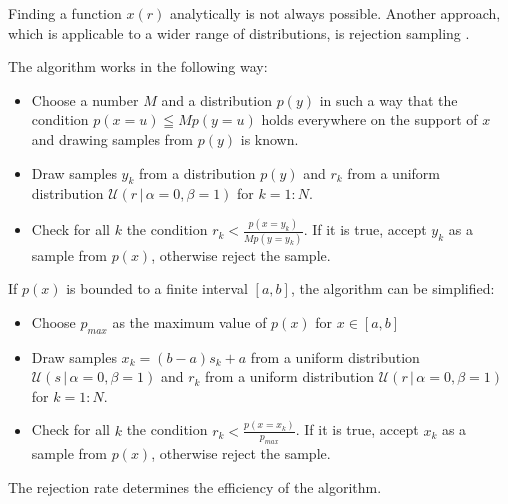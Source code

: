 \documentclass{tstextbook}
\begin{document}
Finding a function $x(r)$ analytically is not always possible. Another approach, which is applicable to a wider range of distributions, is rejection sampling \cite{neumann1951}. 
\begin{definition}
  \label{th:rejectionsampling}
The algorithm works in the following way:
\begin{itemize}
\item
Choose a number $M$ and a distribution $p(y)$ in such a way that the condition $p(x=u)\leqq M p(y=u)$ holds everywhere on the support of $x$ and drawing samples from $p(y)$ is known. 
\item 
Draw samples $y_k$ from a distribution $p(y)$ and $r_k$ from a uniform distribution $\mathcal{U}(r\,\vert\,\alpha=0,\beta=1)$ for $k=1:N$.
\item
Check for all $k$ the condition $r_k < \frac{p(x=y_k)}{M p(y=y_k)}$. If it is true, accept $y_k$ as a sample from $p(x)$, otherwise reject the sample.
\end{itemize}
\end{definition}
If $p(x)$ is bounded to a finite interval $[a,b]$, the algorithm can be simplified:
\begin{itemize}
\item
Choose $p_{max}$ as the maximum value of $p(x)$ for $x\in [a,b]$
\item 
Draw samples $x_k=(b-a)s_k+a$ from a uniform distribution $\mathcal{U}(s\,\vert\,\alpha=0,\beta=1)$ and $r_k$ from a uniform distribution $\mathcal{U}(r\,\vert\,\alpha=0,\beta=1)$ for $k=1:N$.
\item
Check for all $k$ the condition $r_k < \frac{p(x=x_k)}{p_{max}}$. If it is true, accept $x_k$ as a sample from $p(x)$, otherwise reject the sample.
\end{itemize}
The rejection rate determines the efficiency of the algorithm.
\end{document}
